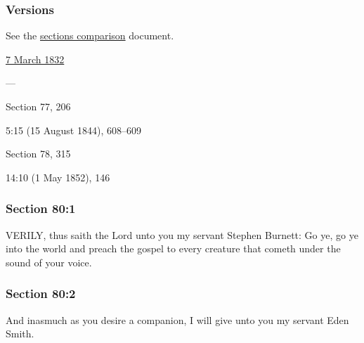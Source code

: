 	\subsubsection{Versions}
		\label{DC80-V}
		
		See the \href{https://drive.google.com/file/d/1goAvNz8jS4R8slYfMG_db55Ty2z_vmgK/view?usp=sharing}{sections comparison} document.
	
		\begin{compactdesc}
			\item[JSP] \hyperref[EMS-1832-JS-7-MAR-1832]{7 March 1832}
			\item[BC] ---
			\item[DC 1835] Section 77, 206
			\item[TS] 5:15 (15 August 1844), 608--609
			\item[DC 1844] Section 78, 315
			\item[MS] 14:10 (1 May 1852), 146
		\end{compactdesc}

	\subsubsection{Section 80:1} %
		\label{DC80-1}

		VERILY, thus saith the Lord unto you my servant Stephen Burnett: Go ye, go ye into the world and preach the gospel to every creature that cometh under the sound of your voice.


	\subsubsection{Section 80:2} %
		\label{DC80-2}

		And inasmuch as you desire a companion, I will give unto you my servant Eden Smith.


